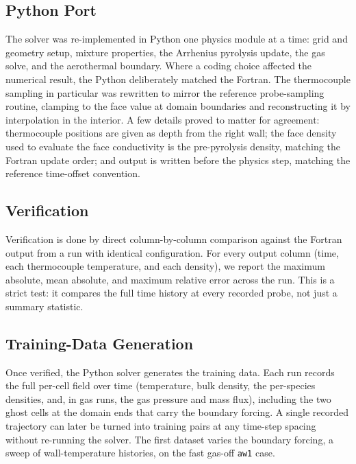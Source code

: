 \documentclass[conference]{IEEEtran}
\begin{document}
\subsection{Python Port}
The solver was re-implemented in Python one physics module at a time: grid and
geometry setup, mixture properties, the Arrhenius pyrolysis update, the gas solve,
and the aerothermal boundary. Where a coding choice affected the numerical result,
the Python deliberately matched the Fortran. The thermocouple sampling in
particular was rewritten to mirror the reference probe-sampling routine, clamping
to the face value at domain boundaries and reconstructing it by interpolation in
the interior. A few details proved to matter for agreement: thermocouple positions
are given as depth from the right wall; the face density used to evaluate the face
conductivity is the pre-pyrolysis density, matching the Fortran update order; and
output is written before the physics step, matching the reference time-offset
convention.

\subsection{Verification}
Verification is done by direct column-by-column comparison against the Fortran
output from a run with identical configuration. For every output column (time,
each thermocouple temperature, and each density), we report the maximum absolute,
mean absolute, and maximum relative error across the run. This is a strict test:
it compares the full time history at every recorded probe, not just a summary
statistic.

\subsection{Training-Data Generation}
Once verified, the Python solver generates the training data. Each run records the
full per-cell field over time (temperature, bulk density, the per-species
densities, and, in gas runs, the gas pressure and mass flux), including the two
ghost cells at the domain ends that carry the boundary forcing. A single recorded
trajectory can later be turned into training pairs at any time-step spacing without
re-running the solver. The first dataset varies the boundary forcing, a sweep of
wall-temperature histories, on the fast gas-off \texttt{aw1} case.
\end{document}
